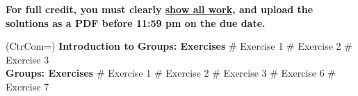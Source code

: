 \documentclass[11pt]{book}
\begin{document}
\thispagestyle{fancy}
\noindent	\textbf{For full credit, you must clearly \underline{show all work}, and upload the solutions as a PDF before 11:59 pm on the due date.}\hfill
\vspace{0.3in}

\begin{easylist}
\ListProperties(CtrCom=\fbox)
\noindent \textbf{Introduction to Groups: Exercises}
\vspace{0.5in}
# Exercise 1
\vspace{0.2in}
# Exercise 2
\vspace{0.2in}
# Exercise 3\\

\vspace{0.5in}
\noindent \textbf{Groups: Exercises}
\vspace{0.5in}
# Exercise 1
\vspace{0.2in}
# Exercise 2
\vspace{0.2in}
# Exercise 3
\vspace{0.2in}
# Exercise 6 
\vspace{0.2in}
# Exercise 7 
 \end{easylist}
\end{document}
